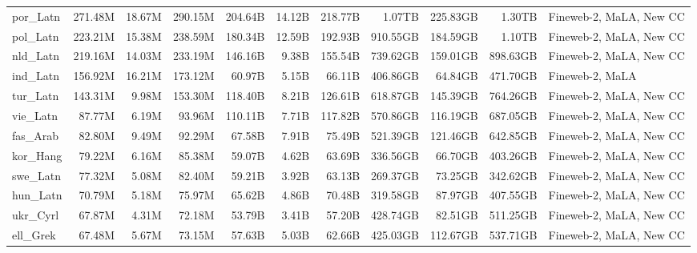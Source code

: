 \begin{table*}[!htp]
{\begin{tabular}{l|rrr|rrr|rrr|l}
por\_Latn                   & 271.48M    & 18.67M       & 290.15M     & 204.64B      & 14.12B         & 218.77B       & 1.07TB     & 225.83GB     & 1.30TB      & Fineweb-2, MaLA, New CC \\
pol\_Latn                   & 223.21M    & 15.38M       & 238.59M     & 180.34B      & 12.59B         & 192.93B       & 910.55GB   & 184.59GB     & 1.10TB      & Fineweb-2, MaLA, New CC \\
nld\_Latn                   & 219.16M    & 14.03M       & 233.19M     & 146.16B      & 9.38B          & 155.54B       & 739.62GB   & 159.01GB     & 898.63GB    & Fineweb-2, MaLA, New CC \\
ind\_Latn                   & 156.92M    & 16.21M       & 173.12M     & 60.97B       & 5.15B          & 66.11B        & 406.86GB   & 64.84GB      & 471.70GB    & Fineweb-2, MaLA         \\
tur\_Latn                   & 143.31M    & 9.98M        & 153.30M     & 118.40B      & 8.21B          & 126.61B       & 618.87GB   & 145.39GB     & 764.26GB    & Fineweb-2, MaLA, New CC \\
vie\_Latn                   & 87.77M     & 6.19M        & 93.96M      & 110.11B      & 7.71B          & 117.82B       & 570.86GB   & 116.19GB     & 687.05GB    & Fineweb-2, MaLA, New CC \\
fas\_Arab                   & 82.80M     & 9.49M        & 92.29M      & 67.58B       & 7.91B          & 75.49B        & 521.39GB   & 121.46GB     & 642.85GB    & Fineweb-2, MaLA, New CC \\
kor\_Hang                   & 79.22M     & 6.16M        & 85.38M      & 59.07B       & 4.62B          & 63.69B        & 336.56GB   & 66.70GB      & 403.26GB    & Fineweb-2, MaLA, New CC \\
swe\_Latn                   & 77.32M     & 5.08M        & 82.40M      & 59.21B       & 3.92B          & 63.13B        & 269.37GB   & 73.25GB      & 342.62GB    & Fineweb-2, MaLA, New CC \\
hun\_Latn                   & 70.79M     & 5.18M        & 75.97M      & 65.62B       & 4.86B          & 70.48B        & 319.58GB   & 87.97GB      & 407.55GB    & Fineweb-2, MaLA, New CC \\
ukr\_Cyrl                   & 67.87M     & 4.31M        & 72.18M      & 53.79B       & 3.41B          & 57.20B        & 428.74GB   & 82.51GB      & 511.25GB    & Fineweb-2, MaLA, New CC \\
ell\_Grek                   & 67.48M     & 5.67M        & 73.15M      & 57.63B       & 5.03B          & 62.66B        & 425.03GB   & 112.67GB     & 537.71GB    & Fineweb-2, MaLA, New CC \\

\end{tabular}}
\end{table*}
